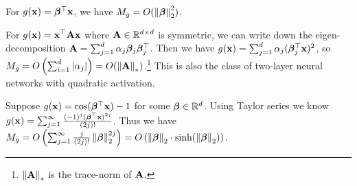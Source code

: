 \begin{example} \label{example:linear}
	For $g(\mathbf{x}) = \bm{\beta}^\top \mathbf{x}$, we have $M_g = O(\left\|\bm{\beta}\right\|_2^2)$.
\end{example}

\begin{example} \label{example:quadratic}
	For $g(\mathbf{x}) = \mathbf{x}^\top \mathbf{A} \mathbf{x}$ where $\mathbf{A} \in \mathbb{R}^{d\times d}$ is symmetric,
	we can write down the eigen-decomposition $\mathbf{A} = \sum_{j=1}^d \alpha_j \bm{\beta}_j \bm{\beta}_j^\top$.
	Then we have $g(\mathbf{x}) = \sum_{j=1}^d \alpha_j (\bm{\beta}_j^\top \mathbf{x})^2$, so $M_g = O\left( \sum_{i=1}^d \left|\alpha_j\right| \right) = O(\left\|\mathbf{A}\right\|_*)$.\footnote{$\left\|\mathbf{A}\right\|_*$ is the trace-norm of $\mathbf{A}$.}
	This is also the class of two-layer neural networks with quadratic activation.
\end{example}


\begin{example}\label{example:cos}
Suppose $g(\mathbf{x}) = \cos(\bm{\beta}^\top \mathbf{x})-1$ for some $\bm{\beta} \in \mathbb{R}^d$.
Using Taylor series we know $g(\mathbf{x}) = \sum_{j=1}^{\infty}\frac{(-1)^j(\bm{\beta}^\top \mathbf{x})^{2j}}{(2j)!}$.
Thus we have
$M_g = O\left( \sum_{j=1}^\infty \frac{j}{(2j)!} \left\|\bm{\beta}\right\|_2^{2j} \right) = O\left( \left\|\bm{\beta}\right\|_2 \cdot \sinh(\left\|\bm{\beta}\right\|_2) \right) $.
\end{example}


